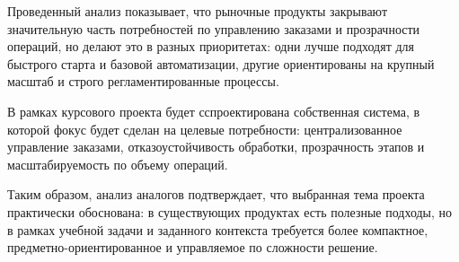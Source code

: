Проведенный анализ показывает, что рыночные продукты закрывают значительную часть
потребностей по управлению заказами и прозрачности операций, но делают это в разных
приоритетах: одни лучше подходят для быстрого старта и базовой автоматизации,
другие ориентированы на крупный масштаб и строго регламентированные процессы.

В рамках курсового проекта будет сспроектирована собственная
система, в которой фокус будет сделан на целевые потребности: централизованное
управление заказами, отказоустойчивость обработки,
прозрачность этапов и масштабируемость по объему операций.

Таким образом, анализ аналогов подтверждает, что выбранная тема проекта
практически обоснована: в существующих продуктах есть полезные подходы,
но в рамках учебной задачи и заданного контекста требуется более компактное,
предметно-ориентированное и управляемое по сложности решение.
